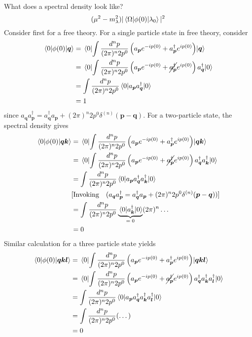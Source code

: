 What does a spectral density look like?
\begin{equation}
    (\mu^2 - m_{\lambda}^{2}) |\mel{\Omega}{\phi(0)}{\lambda_0}|^2
\end{equation}
Consider first for a free theory. For a single particle state in free theory, consider
\begin{align}
    \mel{0}{\phi(0)}{\bm{q}} & = \mel{0}{  \int \frac{d^n p}{(2\pi)^n 2p^0} \left(  a_{\bm{p}} e^{-ip(0)} +  a_{\bm{p}}^{\dagger} e^{ip(0)} \right) }{\bm{q}} \nonumber\\
    & = \mel{0}{  \int \frac{d^n p}{(2\pi)^n 2p^0} \left(  a_{\bm{p}} e^{-ip(0)} +  \cancel{a_{\bm{p}}^{\dagger}} e^{ip(0)} \right) a_{\bm{q}}^{\dagger} }{0} \nonumber\\
    & = \int \frac{d^n p}{(2\pi)^n 2p^0} \mel{0}{a_{\bm{p}} a_{\bm{q}}^{\dagger} }{0}  \nonumber\\
    & = 1
\end{align}
since $ a_{\bm{q}} a_{\bm{p}}^{\dagger} = a_{\bm{q}}^{\dagger}a_{\bm{p}} + (2\pi)^n 2p^0 \delta^{(n)} (\bm{p} - \bm{q})$.
For a two-particle state, the spectral density gives 
\begin{align}
    \mel{0}{\phi(0)}{\bm{q} \bm{k} } & = \mel{0}{  \int \frac{d^n p}{(2\pi)^n 2p^0} \left(  a_{\bm{p}} e^{-ip(0)} +  a_{\bm{p}}^{\dagger} e^{ip(0)} \right) }{\bm{q} \bm{k} } \nonumber\\
    & = \mel{0}{  \int \frac{d^n p}{(2\pi)^n 2p^0} \left(  a_{\bm{p}} e^{-ip(0)} +  \cancel{a_{\bm{p}}^{\dagger}} e^{ip(0)} \right) a_{\bm{q}}^{\dagger}a_{\bm{k}}^{\dagger}  }{0} \nonumber\\
    & = \int \frac{d^n p}{(2\pi)^n 2p^0} \mel{0}{a_{\bm{p}} a_{\bm{q}}^{\dagger} a_{\bm{k}}^{\dagger} }{0} \nonumber\\
    & [\text{Invoking} \quad (a_{\bm{q}} a_{\bm{p}}^{\dagger} = a_{\bm{q}}^{\dagger}a_{\bm{p}} + (2\pi)^n 2p^0 \delta^{(n)} (\bm{p} - \bm{q}))] \nonumber\\
    & = \int \frac{d^n p}{(2\pi)^n 2p^0} \underbrace{\mel{0}{ a_{\bm{k}}^{\dagger} }{0} }_\text{$ = 0$} (2\pi)^n \dots\nonumber\\
    & = 0
\end{align}
Similar calculation for a three particle state yields
\begin{align}
    \mel{0}{\phi(0)}{\bm{q} \bm{k}  \bm{l} } & = \mel{0}{  \int \frac{d^n p}{(2\pi)^n 2p^0} \left(  a_{\bm{p}} e^{-ip(0)} +  a_{\bm{p}}^{\dagger} e^{ip(0)} \right) }{\bm{q} \bm{k}  \bm{l}} \nonumber\\
    & = \mel{0}{  \int \frac{d^n p}{(2\pi)^n 2p^0} \left(  a_{\bm{p}} e^{-ip(0)} +  \cancel{a_{\bm{p}}^{\dagger}} e^{ip(0)} \right) a_{\bm{q}}^{\dagger}a_{\bm{k}}^{\dagger} a_{\bm{l}}^{\dagger}  }{0} \nonumber\\
    & = \int \frac{d^n p}{(2\pi)^n 2p^0} \mel{0}{a_{\bm{p}} a_{\bm{q}}^{\dagger} a_{\bm{k}}^{\dagger} a_{\bm{l}}^{\dagger} }{0} \nonumber\\
    & = \int \frac{d^n p}{(2\pi)^n 2p^0} (\dots )\nonumber\\
    & = 0
\end{align}
